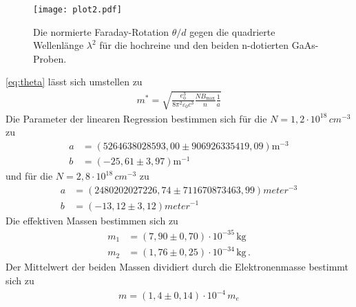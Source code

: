 \begin{figure}[hbt!]
  \label{fig:diff}
  \texttt{[image: plot2.pdf]}
  \caption{Die normierte Faraday-Rotation $\theta/d$ gegen die quadrierte Wellenlänge $\lambda^2$ für die
  hochreine und den beiden n-dotierten GaAs-Proben.}
\end{figure}
\autoref{eq:theta} lässt sich umstellen zu
 \begin{align*}
  m^{*} = \sqrt{\frac{e_0^3}{8\pi^2 \varepsilon_0 c^3} \frac{N B_\text{max}}{n} \frac{1}{a}}
  \end{align*}
Die Parameter der linearen Regression bestimmen sich für die $N=1,2\cdot 10^{18}\,cm^{-3}$ zu
\begin{align*}
  a &= (5264638028593,00 \pm 906926335419,09) \si{\meter}^{-3} \\
  b &= (-25,61 \pm 3,97) \si{\meter}^{-1}
\end{align*}
und für die $N=2,8\cdot 10^{18}\,cm^{-3}$ zu
\begin{align*}
  a &= (2480202027226,74 \pm 711670873463,99) \si{meter}^{-3} \\
  b &= (-13,12 \pm 3,12) \si{meter}^{-1}
\end{align*}
Die effektiven Massen bestimmen sich zu
\begin{align*}
  m_1 &= (7,90 \pm 0,70)\cdot 10^{-35}\,\si{\kilogram} \\
  m_2 &= (1,76 \pm 0,25)\cdot 10^{-34}\,\si{\kilogram}\,.
\end{align*}
Der Mittelwert der beiden Massen dividiert durch die Elektronenmasse bestimmt sich zu
\begin{align*}
  m = (1,4 \pm 0,14)\cdot 10^{-4}\, m_{e}
\end{align*}